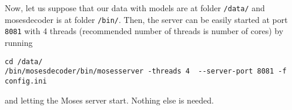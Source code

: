 Now, let us suppose that our data with models are at folder \texttt{/data/} and mosesdecoder is at folder \texttt{/bin/}. Then, the server can be easily started at port \texttt{8081} with 4 threads (recommended number of threads is number of cores) by running

\begin{lstlisting}
cd /data/
/bin/mosesdecoder/bin/mosesserver -threads 4  --server-port 8081 -f config.ini 
\end{lstlisting}

and letting the Moses server start. Nothing else is needed.
